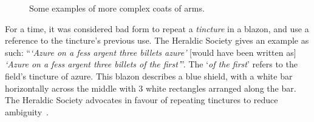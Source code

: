 \documentclass[nobib, a4paper, twoside, justified]{tufte-book}
\begin{document}
\begin{figure}[h]
  \qquad
  \caption{Some examples of more complex coats of arms.}\label{fig:complex_shields}
\end{figure}

For a time, it was considered bad form to repeat a \textit{tincture} in a blazon, and use a
reference to the tincture's previous use. The Heraldic Society gives an example as such:
``\textit{`Azure on a fess argent three billets azure'} [would have been written as] \textit{`Azure
on a fess argent three billets of the first'}''. The `\textit{of the first}' refers to the field's
tincture of azure. This blazon describes a blue shield, with a white bar horizontally across the
middle with 3 white rectangles arranged along the bar. The Heraldic Society advocates in favour of
repeating tinctures to reduce ambiguity~\autocite{blazon_in_coa}.

\backmatter

\printbibliography[heading=bibintoc]
\end{document}
